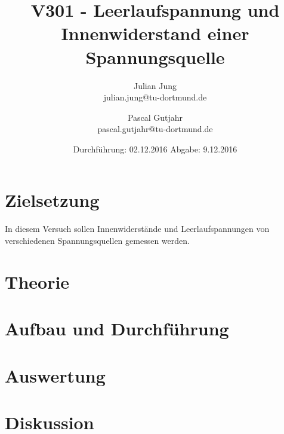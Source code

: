 

\title{V301 - Leerlaufspannung und Innenwiderstand einer Spannungsquelle}
\author{Julian Jung \\ julian.jung@tu-dortmund.de
  \and Pascal Gutjahr \\ pascal.gutjahr@tu-dortmund.de}
  \date{Durchführung: 02.12.2016
  \hspace{3em}
  Abgabe: 9.12.2016}
  
\maketitle
\newpage
\tableofcontents
\newpage
\section{Zielsetzung}
In diesem Versuch sollen Innenwiderstände und Leerlaufspannungen von verschiedenen
Spannungsquellen gemessen werden.
\section{Theorie}
 
\section{Aufbau und Durchführung}
% 
\section{Auswertung}
% 
\section{Diskussion}
% 
\printbibliography

